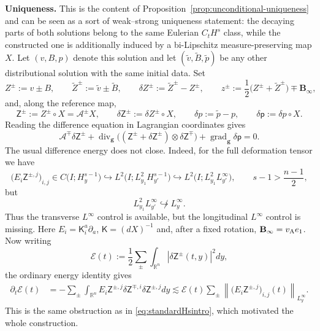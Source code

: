 \documentclass[11pt,reqno]{amsart}
\theoremstyle{plain}
\theoremstyle{definition}
\theoremstyle{remark}
\numberwithin{equation}{section}
\DeclareMathOperator{\Div}{div}
\DeclareMathOperator{\grad}{grad}
\newcommand{\Kmat}{\mathsf K}
\newcommand{\gmetric}{\mathbf g}
\newcommand{\Binf}{\mathbf B_\infty}
\newcommand{\Real}{\mathbb R}
\newcommand{\Rn}{\Real^n}
\begin{document}
\textbf{Uniqueness.} This is the content of
Proposition~\ref{prop:unconditional-uniqueness} and can be seen as a sort of
weak--strong uniqueness statement: the decaying parts of both solutions
belong to the same Eulerian $C_tH^s$ class, while the constructed one is
additionally induced by a bi-Lipschitz measure-preserving map $X$.  Let
$(v,B,p)$ denote this solution and let
$(\widetilde v,\widetilde B,\widetilde p)$ be any other distributional
solution with the same initial data.  Set
\[
 Z^\pm:=v\pm B,
 \qquad
 \widetilde Z^\pm:=\widetilde v\pm\widetilde B,
 \qquad
 \delta Z^\pm:=\widetilde Z^\pm-Z^\pm,
 \qquad
 z^\pm:=\frac12\bigl(Z^\pm+\widetilde Z^\pm\bigr)\mp\Binf,
\]
and, along the reference map,
\[
 \mathsf Z^\pm:=Z^\pm\circ X=\mathcal A^\pm X,
 \qquad
 \delta\mathsf Z^\pm:=\delta Z^\pm\circ X,
 \qquad
 \delta p:=\widetilde p-p,
 \qquad
 \delta\mathsf p:=\delta p\circ X.
\]
Reading the difference equation in Lagrangian coordinates gives
\begin{equation}\label{eq:overview-conservative-difference}
 \mathcal A^\mp\delta\mathsf Z^\pm
 +\Div_{\gmetric}\bigl(
   (\mathsf Z^\pm+\delta\mathsf Z^\pm)
   \otimes\delta\mathsf Z^\mp\bigr)
 +\grad_{\gmetric}\delta\mathsf p=0.
\end{equation}
The usual difference energy does not close.  Indeed, for the full
deformation tensor we have
\[
 \bigl(E_i\mathsf Z^{\pm,j}\bigr)_{i,j}
 \in C\bigl(I;H^{s-1}_y\bigr)
 \hookrightarrow
 L^2\bigl(I;L^2_{y_1}H^{s-1}_{y'}\bigr)
 \hookrightarrow
 L^2\bigl(I;L^2_{y_1}L^\infty_{y'}\bigr),
 \qquad
 s-1>\frac{n-1}{2},
\]
but
\[
 L^2_{y_1}L^\infty_{y'}\not\hookrightarrow L^\infty_y.
\]
Thus the transverse $L^\infty$ control is available, but the longitudinal
$L^\infty$ control is missing.  Here $E_i=\Kmat_i^a\partial_a$,
$\Kmat=(dX)^{-1}$ and, after a fixed rotation,
$\Binf=v_{\rm A}e_1$.  Now writing
\[
 \mathcal E(t):=\frac12\sum_\pm
 \int_{\Real^n}|\delta\mathsf Z^\pm(t,y)|^2dy,
\]
the ordinary energy identity gives
\[
\begin{aligned}
 \partial_t\mathcal E(t)
 &=-\sum_\pm\int_{\Rn}
 E_i\mathsf Z^{\pm,j}
 \delta\mathsf Z^{\mp,i}
 \delta\mathsf Z^{\pm,j}dy\lesssim
 \mathcal E(t)\sum_\pm
 \left\|
 \bigl(E_i\mathsf Z^{\pm,j}\bigr)_{i,j}(t)
 \right\|_{L^\infty_y}.
\end{aligned}
\]
This is the same obstruction as in
\eqref{eq:standardHsintro}, which motivated the whole construction.
\end{document}
